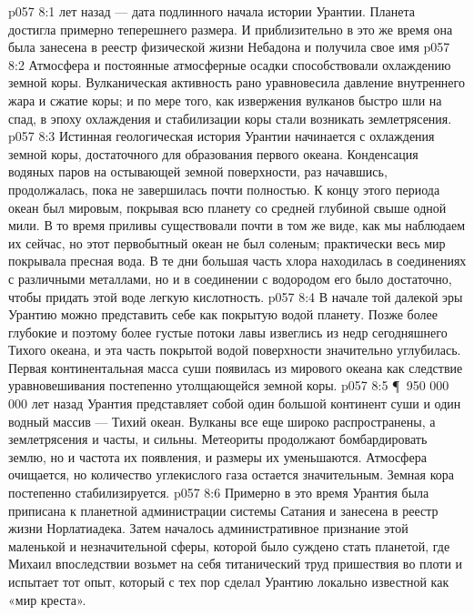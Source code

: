 \vs p057 8:1  лет назад --- дата подлинного начала истории Урантии. Планета достигла примерно теперешнего размера. И приблизительно в это же время она была занесена в реестр физической жизни Небадона и получила свое имя 
\vs p057 8:2 Атмосфера и постоянные атмосферные осадки способствовали охлаждению земной коры. Вулканическая активность рано уравновесила давление внутреннего жара и сжатие коры; и по мере того, как извержения вулканов быстро шли на спад, в эпоху охлаждения и стабилизации коры стали возникать землетрясения.
\vs p057 8:3 Истинная геологическая история Урантии начинается с охлаждения земной коры, достаточного для образования первого океана. Конденсация водяных паров на остывающей земной поверхности, раз начавшись, продолжалась, пока не завершилась почти полностью. К концу этого периода океан был мировым, покрывая всю планету со средней глубиной свыше одной мили. В то время приливы существовали почти в том же виде, как мы наблюдаем их сейчас, но этот первобытный океан не был соленым; практически весь мир покрывала пресная вода. В те дни большая часть хлора находилась в соединениях с различными металлами, но и в соединении с водородом его было достаточно, чтобы придать этой воде легкую кислотность.
\vs p057 8:4 В начале той далекой эры Урантию можно представить себе как покрытую водой планету. Позже более глубокие и поэтому более густые потоки лавы извеглись из недр сегодняшнего Тихого океана, и эта часть покрытой водой поверхности значительно углубилась. Первая континентальная масса суши появилась из мирового океана как следствие уравновешивания постепенно утолщающейся земной коры.
\vs p057 8:5 \P\ 950 000 000 лет назад Урантия представляет собой один большой континент суши и один водный массив --- Тихий океан. Вулканы все еще широко распространены, а землетрясения и часты, и сильны. Метеориты продолжают бомбардировать землю, но и частота их появления, и размеры их уменьшаются. Атмосфера очищается, но количество углекислого газа остается значительным. Земная кора постепенно стабилизируется.
\vs p057 8:6 Примерно в это время Урантия была приписана к планетной администрации системы Сатания и занесена в реестр жизни Норлатиадека. Затем началось административное признание этой маленькой и незначительной сферы, которой было суждено стать планетой, где Михаил впоследствии возьмет на себя титанический труд пришествия во плоти и испытает тот опыт, который с тех пор сделал Урантию локально известной как «мир креста».
